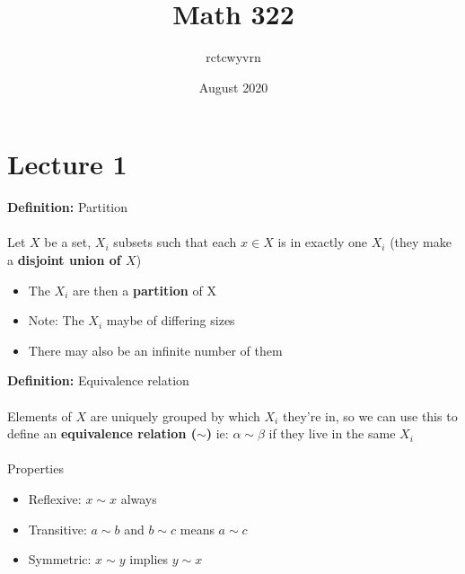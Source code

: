 \documentclass{article}
\title{Math 322}
\author{rctcwyvrn}
\date{August 2020}
\begin{document}
\maketitle

\section{Lecture 1}
\begin{definition} 
\textbf{Definition:} Partition \\
~\\
Let $X$ be a set, $X_i$ subsets such that each $x\in X$ is in exactly one $X_i$ (they make a {\color{blue} \textbf{disjoint union of $X$}})
\begin{itemize}
	\item The $X_i$ are then a {\color{blue} \textbf{partition}} of X
	\item Note: The $X_i$ maybe of differing sizes
	\item There may also be an infinite number of them
\end{itemize}
\end{definition}
\begin{definition} 
\textbf{Definition:} Equivalence relation \\
~\\
Elements of $X$ are uniquely grouped by which $X_i$ they're in, so we can use this to define an {\color{blue} \textbf{equivalence relation ($\sim$)}} ie: $\alpha\sim\beta$ if they live in the same $X_i$ \\
~\\
Properties
\begin{itemize}
	\item Reflexive: $x\sim x$ always
	\item Transitive: $a\sim b$ and $b\sim c$ means $a\sim c$
	\item Symmetric: $x\sim y$ implies $y\sim x$
\end{itemize}
\end{definition}
\end{document}
